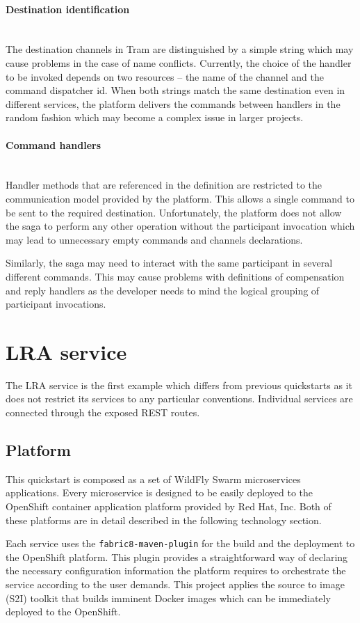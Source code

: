 \documentclass[oneside,
  digital, %
  table,   %
  lof,     %
  lot,     %
]{fithesis3}
\newcommand{\newlinepar}[1]{\paragraph{#1}\needspace{3\baselineskip}\mbox{}\\}
\begin{document}
\newlinepar{Destination identification}

The destination channels in Tram are distinguished by a simple string which may cause problems in the case of name conflicts. Currently, the choice of the handler to be invoked depends on two resources -- the name of the channel and the command dispatcher id. When both strings match the same destination even in different services, the platform delivers the commands between handlers in the random fashion which may become a complex issue in larger projects.

\newlinepar{Command handlers}

Handler methods that are referenced in the definition are restricted to the communication model provided by the platform. This allows a single command to be sent to the required destination. Unfortunately, the platform does not allow the saga to perform any other operation without the participant invocation which may lead to unnecessary empty commands and channels declarations. 

Similarly, the saga may need to interact with the same participant in several different commands. This may cause problems with definitions of compensation and reply handlers as the developer needs to mind the logical grouping of participant invocations.

\section{LRA service}

The LRA service is the first example which differs from previous quickstarts as it does not restrict its services to any particular conventions. Individual services are connected through the exposed REST routes.

\subsection{Platform}

This quickstart is composed as a set of WildFly Swarm microservices applications. Every microservice is designed to be easily deployed to the OpenShift container application platform provided by Red Hat, Inc. \cite{openshift} Both of these platforms are in detail described in the following technology section.

Each service uses the \texttt{fabric8-maven-plugin} for the build and the deployment to the OpenShift platform. This plugin provides a straightforward way of declaring the necessary configuration information the platform requires to orchestrate the service according to the user demands. This project applies the source to image (S2I) toolkit that builds imminent Docker images which can be immediately deployed to the OpenShift. 
\end{document}
